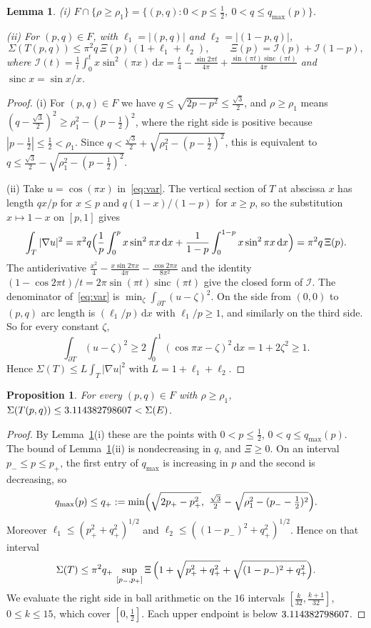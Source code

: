 \documentclass[11pt]{article}
\newtheorem{proposition}[theorem]{Proposition}
\newtheorem{lemma}[theorem]{Lemma}
\theoremstyle{definition}
\theoremstyle{remark}
\newcommand{\dd}{\,\mathrm{d}}
\DeclareMathOperator{\sinc}{sinc}
\begin{document}
\begin{lemma}\label{lem:cos}
\textup{(i)} $F\cap\{\rho\ge\rho_1\}=\{(p,q):0<p\le\frac12,\ 0<q\le q_{\max}(p)\}$.

\textup{(ii)} For $(p,q)\in F$, with $\ell_1=|(p,q)|$ and $\ell_2=|(1-p,q)|$,
\[\Sigma(T(p,q))\le\pi^2q\,\Xi(p)\,(1+\ell_1+\ell_2),\qquad \Xi(p)=\mathcal I(p)+\mathcal I(1-p),\]
where $\mathcal I(t)=\frac1t\int_0^tx\sin^2(\pi x)\dd x=\frac t4-\frac{\sin2\pi t}{4\pi}+\frac{\sin(\pi t)\sinc(\pi t)}{4\pi}$
and $\sinc x=\sin x/x$.
\end{lemma}
\begin{proof}
(i) For $(p,q)\in F$ we have $q\le\sqrt{2p-p^2}\le\frac{\sqrt3}2$, and $\rho\ge\rho_1$ means
$(q-\frac{\sqrt3}2)^2\ge\rho_1^2-(p-\frac12)^2$, where the right side is positive because
$|p-\frac12|\le\frac12<\rho_1$. Since $q<\frac{\sqrt3}2+\sqrt{\rho_1^2-(p-\frac12)^2}$, this is equivalent to
$q\le\frac{\sqrt3}2-\sqrt{\rho_1^2-(p-\frac12)^2}$.

(ii) Take $u=\cos(\pi x)$ in~\eqref{eq:var}. The vertical section of $T$ at abscissa $x$ has length $qx/p$
for $x\le p$ and $q(1-x)/(1-p)$ for $x\ge p$, so the substitution $x\mapsto1-x$ on $[p,1]$ gives
\[\int_T|\nabla u|^2=\pi^2q\Bigl(\frac1p\int_0^px\sin^2\pi x\dd x+\frac1{1-p}\int_0^{1-p}x\sin^2\pi x\dd x\Bigr)=\pi^2q\,\Xi(p).\]
The antiderivative $\frac{x^2}4-\frac{x\sin2\pi x}{4\pi}-\frac{\cos2\pi x}{8\pi^2}$ and the identity
$(1-\cos2\pi t)/t=2\pi\sin(\pi t)\sinc(\pi t)$ give the closed form of $\mathcal I$. The denominator of~\eqref{eq:var}
is $\min_\zeta\int_{\partial T}(u-\zeta)^2$. On the side from $(0,0)$ to $(p,q)$ arc length is
$(\ell_1/p)\dd x$ with $\ell_1/p\ge1$, and similarly on the third side. So for every constant $\zeta$,
\[\int_{\partial T}(u-\zeta)^2\ge2\int_0^1(\cos\pi x-\zeta)^2\dd x=1+2\zeta^2\ge1.\]
Hence $\Sigma(T)\le L\int_T|\nabla u|^2$ with $L=1+\ell_1+\ell_2$.
\end{proof}

\begin{proposition}\label{prop:far}
For every $(p,q)\in F$ with $\rho\ge\rho_1$, $\Sigma(T(p,q))\le3.114382798607<\Sigma(E)$.
\end{proposition}
\begin{proof}
By Lemma~\ref{lem:cos}(i) these are the points with $0<p\le\frac12$, $0<q\le q_{\max}(p)$. The bound of
Lemma~\ref{lem:cos}(ii) is nondecreasing in $q$, and $\Xi\ge0$. On an interval $p_-\le p\le p_+$, the
first entry of $q_{\max}$ is increasing in $p$ and the second is decreasing, so
\[q_{\max}(p)\le q_+:=\min\Bigl(\sqrt{2p_+-p_+^2},\ \tfrac{\sqrt3}2-\sqrt{\rho_1^2-(p_--\tfrac12)^2}\Bigr).\]
Moreover $\ell_1\le(p_+^2+q_+^2)^{1/2}$ and $\ell_2\le((1-p_-)^2+q_+^2)^{1/2}$. Hence on that interval
\[\Sigma(T)\le\pi^2q_+\,\sup_{[p_-,p_+]}\Xi\,\Bigl(1+\sqrt{p_+^2+q_+^2}+\sqrt{(1-p_-)^2+q_+^2}\Bigr).\]
We evaluate the right side in ball arithmetic on the $16$ intervals $[\frac k{32},\frac{k+1}{32}]$,
$0\le k\le15$, which cover $[0,\frac12]$. Each upper endpoint is below $3.114382798607$.
\end{proof}
\end{document}
